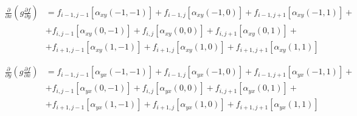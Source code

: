 \begin{equation*}
    \begin{split}
        \frac
            {\partial}
            {\partial x}
        \left(
            g
            \frac
                {\partial f}
                {\partial y}
        \right)
        &
        =
        f_{i-1, j-1}
        \left[
            \alpha_{xy} \left(-1, -1\right)
        \right]
        +
        f_{i-1,j}
        \left[
            \alpha_{xy} \left(-1, 0\right)
        \right]
        +
        f_{i-1, j+1}
        \left[
            \alpha_{xy} \left(-1, 1\right)
        \right]
        +
        \\
        &
        +
        f_{i, j-1}
        \left[
            \alpha_{xy} \left(0, -1\right)
        \right]
        +
        f_{i, j}
        \left[
            \alpha_{xy} \left(0, 0\right)
        \right]
        +
        f_{i, j+1}
        \left[
            \alpha_{xy} \left(0, 1\right)
        \right]
        +
        \\
        &
        +
        f_{i+1, j-1}
        \left[
            \alpha_{xy} \left(1, -1\right)
        \right]
        +
        f_{i+1, j}
        \left[
            \alpha_{xy} \left(1, 0\right)
        \right]
        +
        f_{i+1, j+1}
        \left[
            \alpha_{xy} \left(1, 1\right)
        \right]
    \end{split}
\end{equation*}

\begin{equation*}
    \begin{split}
        \frac
            {\partial}
            {\partial y}
        \left(
            g
            \frac
                {\partial f}
                {\partial x}
        \right)
        &
        =
        f_{i-1, j-1}
        \left[
            \alpha_{yx} \left(-1, -1\right)
        \right]
        +
        f_{i-1,j}
        \left[
            \alpha_{yx} \left(-1, 0\right)
        \right]
        +
        f_{i-1, j+1}
        \left[
            \alpha_{yx} \left(-1, 1\right)
        \right]
        +
        \\
        &
        +
        f_{i, j-1}
        \left[
            \alpha_{yx} \left(0, -1\right)
        \right]
        +
        f_{i, j}
        \left[
            \alpha_{yx} \left(0, 0\right)
        \right]
        +
        f_{i, j+1}
        \left[
            \alpha_{yx} \left(0, 1\right)
        \right]
        +
        \\
        &
        +
        f_{i+1, j-1}
        \left[
            \alpha_{yx} \left(1, -1\right)
        \right]
        +
        f_{i+1, j}
        \left[
            \alpha_{yx} \left(1, 0\right)
        \right]
        +
        f_{i+1, j+1}
        \left[
            \alpha_{yx} \left(1, 1\right)
        \right]
    \end{split}
\end{equation*}

